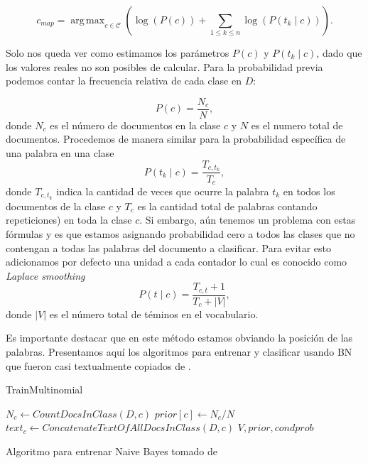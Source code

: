 \documentclass{llncs}
\DeclareMathOperator*{\argmax}{arg\,max}
\begin{document}
		\[
				c_{map} = \argmax_{c\in\mathcal{C}} \left( \log(P(c))  + \sum_{1\leq k\leq n} \log(P(t_k\mid c)) \right).
		\]
		
		Solo nos queda ver como estimamos los par\'ametros $P(c)$ y $P (t_k\mid c)$, dado que los valores reales no son posibles de calcular.	Para la probabilidad previa podemos contar la frecuencia relativa de cada clase en $D$:
		
		\[P(c) = \frac{ N_c }{N} , \]
		donde $N_c$ es el n\'umero de documentos en la clase $c$ y $N$ es el numero total de documentos. Procedemos de manera similar para la probabilidad espec\'ifica de una palabra en una clase
		\[
			P(t_k\mid c) =\frac{ T_{c,t_k}}{T_{c}},
		\]
		donde $T_{c,t_k}$ indica la cantidad de veces que ocurre  la palabra $t_k$ en todos los documentos de la clase $c$ y $T_{c}$ es la cantidad total de palabras contando repeticiones) en toda la clase $c$. Si embargo, a\'un tenemos un problema con estas f\'ormulas y es que estamos asignando probabilidad cero a todos las clases que no contengan a todas las palabras del documento a clasificar. Para evitar esto adicionamos por defecto una unidad a cada contador lo cual es conocido como \emph{Laplace smoothing}
		\[
			P(t\mid c) = \frac{T_{c,t} + 1}{T_c + |V|},	
		\]
		donde $|V|$ es el n\'umero total de t\'eminos en el vocabulario.
		
		 Es importante destacar que en este m\'etodo estamos obviando la posici\'on de las palabras. Presentamos aqu\'i los algoritmos para entrenar y clasificar usando BN que fueron casi textualmente copiados de \cite[Figure $13.2$]{B1}.
		 
		 
		 
		 \begin{algorithm}{}\label{Alg1}
		 			\caption{TrainMultinomial}
		 	\begin{algorithmic}[1]
		 		
		 		\State $N_c \leftarrow CountDocsInClass(D,c)$
		 		\State $prior[c] \leftarrow N_c/N$
		 		\State $text_c \leftarrow ConcatenateTextOfAllDocsInClass(D, c)$
		 		\EndFor
		 		\EndFor 
		 		\EndFor
		 		\State \textbf{\Return} $V, prior, condprob$
		 	\end{algorithmic}
		 	
		 	\smallskip
		 	\tiny{Algoritmo para entrenar Naive Bayes tomado de \cite[Figura 13.2]{B1}}
		 \end{algorithm}
		 
\end{document}
